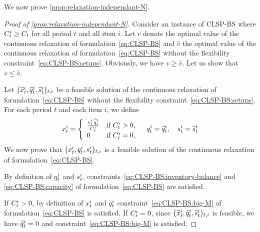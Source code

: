 We now prove \cref{prop:relaxation-independant-N}.

\begin{proof}[Proof of \cref{prop:relaxation-independant-N}]
Consider an instance of CLSP-BS where $C_t^i\ge C_t$ for all period $t$ and all item $i$.
Let $v$ denote the optimal value of the continuous relaxation of formulation~\eqref{eq:CLSP-BS} and $\widehat{v}$ the optimal value of the continuous relaxation of formulation~\eqref{eq:CLSP-BS} without the flexibility constraint~\eqref{eq:CLSP-BS:setups}.
Obviously, we have $v \ge \widehat{v}$.
Let us show that $v \le \widehat{v}$.

Let $\bracket{\widehat{\setup}_t^i, \widehat{\quantity}_t^i, \widehat{\inventory}_t^i}_{t,i}$ be a feasible solution of the continuous relaxation of formulation~\eqref{eq:CLSP-BS} without the flexibility constraint~\eqref{eq:CLSP-BS:setups}.
For each period $t$ and each item $i$, we define
\begin{equation}
  \setup_t^i=
  \left\{
  \begin{array}{ll}
  \frac{\rate_t^i\,\widehat{\quantity}_t^i}{\capacity_t^i} & \mbox{if}\ \capacity_t^i>0,
  \\
  0 & \mbox{if}\ \capacity_t^i=0,
  \end{array}
  \right.
  \quad
  \quantity_t^i=\widehat{\quantity}_t^i
  ,\quad
  \inventory_t^i=\widehat{\inventory}_t^i
\end{equation}
We now prove that $\bracket{\setup_t^i, \quantity_t^i, \inventory_t^i}_{t,i}$ is a feasible solution of the continuous relaxation of formulation~\eqref{eq:CLSP-BS}.

By definition of $q_t^i$ and $s_t^i$, constraints~\eqref{eq:CLSP-BS:inventory-balance} and \eqref{eq:CLSP-BS:capacity} of formulation~\eqref{eq:CLSP-BS} are satisfied.

If $C_t^i>0$, by definition of $x_t^i$ and $q_t^i$ constraint~\eqref{eq:CLSP-BS:big-M} of formulation~\eqref{eq:CLSP-BS} is satisfied.
If $C_t^i=0$, since $\bracket{\widehat{\setup}_t^i, \widehat{\quantity}_t^i, \widehat{\inventory}_t^i}_{t,i}$ is feasible, we have $\widehat{q}_t^i=0$ and constraint~\eqref{eq:CLSP-BS:big-M} is satisfied.



\end{proof}
